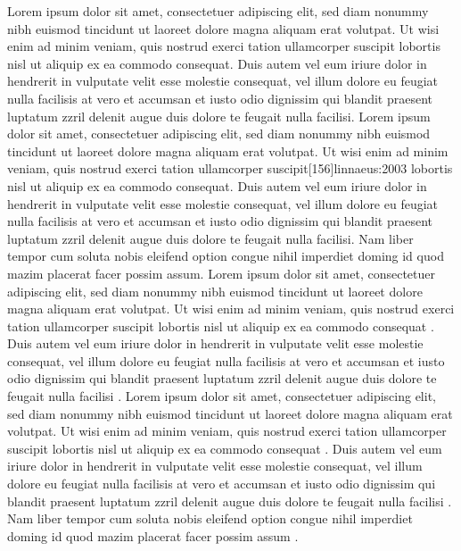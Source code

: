 \documentclass[a4paper,12pt]{scrartcl}
\begin{document}
    {
        {Lorem ipsum dolor sit amet, consectetuer adipiscing elit, sed diam nonummy nibh euismod tincidunt ut laoreet dolore magna aliquam erat volutpat. Ut wisi enim ad minim veniam, quis nostrud exerci tation ullamcorper suscipit lobortis nisl ut aliquip ex ea commodo consequat.\autocite{auler:hiller:2015} Duis autem vel eum iriure dolor in hendrerit in vulputate velit esse molestie consequat, vel illum dolore eu feugiat nulla facilisis at vero et accumsan et iusto odio dignissim qui blandit praesent luptatum zzril delenit augue duis dolore te feugait nulla facilisi.\autocites[68]{auler:hiller:2011}[48]{auler:hiller:2015a}[159--187]{auler:hiller:2015}[40--41]{auler:hiller:2016}[15--23]{tacitus:1981}[19]{de:neck:yoder:1978}[69]{auler:hiller:2011} Lorem ipsum dolor sit amet, consectetuer adipiscing elit, sed diam nonummy nibh euismod tincidunt ut laoreet dolore magna aliquam erat volutpat. Ut wisi enim ad minim veniam\autocites[103]{ib:2016}[266--268]{boppert:1998}[108]{ib:2016}, quis nostrud exerci tation ullamcorper suscipit[156]{linnaeus:2003} lobortis nisl ut aliquip ex ea commodo consequat.\autocite{kenmore} Duis autem vel eum iriure dolor in hendrerit in vulputate velit esse molestie consequat, vel illum dolore eu feugiat nulla facilisis at vero et accumsan et iusto odio dignissim qui blandit praesent luptatum\autocite[103]{ib:2016} zzril delenit augue duis dolore te feugait nulla facilisi.\autocite{kenmore} Nam liber tempor cum soluta nobis eleifend\autocite[41--43]{auler:hiller:2015} option congue nihil imperdiet\autocite[19]{de:neck:yoder:1978} doming id quod mazim placerat facer possim assum.\autocite[145--146]{todorova:et:al:1981}}
        {
            {Lorem ipsum dolor sit amet, consectetuer adipiscing elit, sed diam nonummy nibh euismod tincidunt ut laoreet dolore magna aliquam erat volutpat. Ut wisi enim ad minim veniam, quis nostrud exerci tation ullamcorper suscipit lobortis nisl ut aliquip ex ea commodo consequat \autocite{auler:hiller:2015}. Duis autem vel eum iriure dolor in hendrerit in vulputate velit esse molestie consequat, vel illum dolore eu feugiat nulla facilisis at vero et accumsan et iusto odio dignissim qui blandit praesent luptatum zzril delenit augue duis dolore te feugait nulla facilisi \autocite{auler:hiller:2011,auler:hiller:2015a,auler:hiller:2015,auler:hiller:2016,tacitus:1981,de:neck:yoder:1978}. Lorem ipsum dolor sit amet, consectetuer adipiscing elit, sed diam nonummy nibh euismod tincidunt ut laoreet dolore magna aliquam erat volutpat. Ut wisi enim ad minim veniam, quis nostrud exerci tation ullamcorper suscipit  lobortis nisl ut aliquip ex ea commodo consequat \autocite{kenmore}. Duis autem vel eum iriure dolor in hendrerit in vulputate velit esse molestie consequat\autocites[73--75]{mueller:f:1991}[105--108]{mueller:a:1991}[68--70]{mueller:h:1900}[61]{mueller:har:1988}, vel illum dolore eu feugiat nulla facilisis at vero et accumsan et iusto odio dignissim qui blandit praesent luptatum zzril delenit augue duis dolore te feugait nulla facilisi \autocite{kenmore}. Nam liber tempor cum soluta nobis eleifend option congue nihil imperdiet doming id quod mazim placerat facer possim assum \autocite{todorova:et:al:1981}.}
            {}%
        }%
    }%
\end{document}
